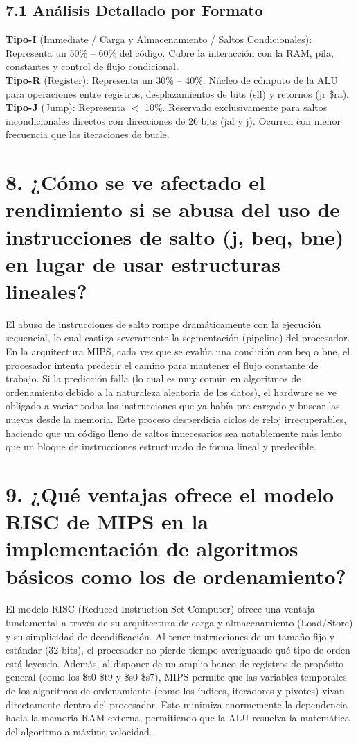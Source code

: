 \documentclass[12pt,a4paper]{article}
\begin{document}
\subsection*{7.1 Análisis Detallado por Formato}
\textbf{Tipo-I} (Immediate / Carga y Almacenamiento / Saltos Condicionales): Representa un 50\% -- 60\% del código. Cubre la interacción con la RAM, pila, constantes y control de flujo condicional.\\
\textbf{Tipo-R} (Register): Representa un 30\% -- 40\%. Núcleo de cómputo de la ALU para operaciones entre registros, desplazamientos de bits (sll) y retornos (jr \$ra).\\
\textbf{Tipo-J} (Jump): Representa $<$ 10\%. Reservado exclusivamente para saltos incondicionales directos con direcciones de 26 bits (jal y j). Ocurren con menor frecuencia que las iteraciones de bucle.

\section*{8. ¿Cómo se ve afectado el rendimiento si se abusa del uso de instrucciones de salto (j, beq, bne) en lugar de usar estructuras lineales?}
El abuso de instrucciones de salto rompe dramáticamente con la ejecución secuencial, lo cual castiga severamente la segmentación (pipeline) del procesador. En la arquitectura MIPS, cada vez que se evalúa una condición con beq o bne, el procesador intenta predecir el camino para mantener el flujo constante de trabajo. Si la predicción falla (lo cual es muy común en algoritmos de ordenamiento debido a la naturaleza aleatoria de los datos), el hardware se ve obligado a vaciar todas las instrucciones que ya había pre cargado y buscar las nuevas desde la memoria. Este proceso desperdicia ciclos de reloj irrecuperables, haciendo que un código lleno de saltos innecesarios sea notablemente más lento que un bloque de instrucciones estructurado de forma lineal y predecible.

\section*{9. ¿Qué ventajas ofrece el modelo RISC de MIPS en la implementación de algoritmos básicos como los de ordenamiento?}
El modelo RISC (Reduced Instruction Set Computer) ofrece una ventaja fundamental a través de su arquitectura de carga y almacenamiento (Load/Store) y su simplicidad de decodificación. Al tener instrucciones de un tamaño fijo y estándar (32 bits), el procesador no pierde tiempo averiguando qué tipo de orden está leyendo. Además, al disponer de un amplio banco de registros de propósito general (como los \$t0-\$t9 y \$s0-\$s7), MIPS permite que las variables temporales de los algoritmos de ordenamiento (como los índices, iteradores y pivotes) vivan directamente dentro del procesador. Esto minimiza enormemente la dependencia hacia la memoria RAM externa, permitiendo que la ALU resuelva la matemática del algoritmo a máxima velocidad.
\end{document}
